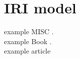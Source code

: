 
\section{IRI model}
example MISC \cite{exampleMISC}.\\
example Book \cite{exampleBOOK}.\\
example article \cite[p.~5]{exampleARTICLE}